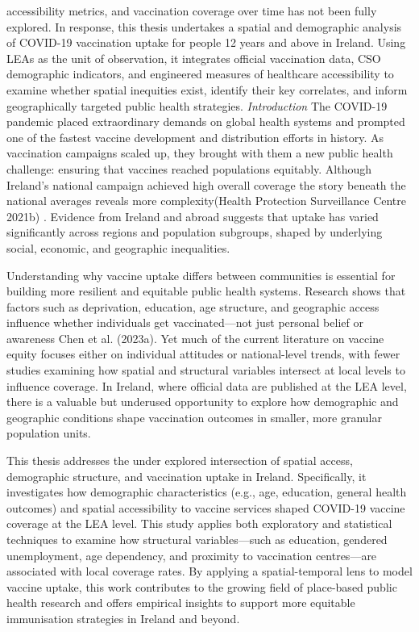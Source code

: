 \documentclass{article}
\begin{document}
accessibility metrics, and vaccination coverage over time has not been
fully explored. In response, this thesis undertakes a spatial and
demographic analysis of COVID-19 vaccination uptake for people 12 years
and above in Ireland. Using LEAs as the unit of observation, it
integrates official vaccination data, CSO demographic indicators, and
engineered measures of healthcare accessibility to examine whether
spatial inequities exist, identify their key correlates, and inform
geographically targeted public health strategies. \emph{Introduction}
The COVID-19 pandemic placed extraordinary demands on global health
systems and prompted one of the fastest vaccine development and
distribution efforts in history. As vaccination campaigns scaled up,
they brought with them a new public health challenge: ensuring that
vaccines reached populations equitably. Although Ireland's national
campaign achieved high overall coverage the story beneath the national
averages reveals more complexity(Health Protection Surveillance Centre
2021b) . Evidence from Ireland and abroad suggests that uptake has
varied significantly across regions and population subgroups, shaped by
underlying social, economic, and geographic inequalities.

Understanding why vaccine uptake differs between communities is
essential for building more resilient and equitable public health
systems. Research shows that factors such as deprivation, education, age
structure, and geographic access influence whether individuals get
vaccinated---not just personal belief or awareness Chen et al. (2023a).
Yet much of the current literature on vaccine equity focuses either on
individual attitudes or national-level trends, with fewer studies
examining how spatial and structural variables intersect at local levels
to influence coverage. In Ireland, where official data are published at
the LEA level, there is a valuable but underused opportunity to explore
how demographic and geographic conditions shape vaccination outcomes in
smaller, more granular population units.

This thesis addresses the under explored intersection of spatial access,
demographic structure, and vaccination uptake in Ireland. Specifically,
it investigates how demographic characteristics (e.g., age, education,
general health outcomes) and spatial accessibility to vaccine services
shaped COVID-19 vaccine coverage at the LEA level. This study applies
both exploratory and statistical techniques to examine how structural
variables---such as education, gendered unemployment, age dependency,
and proximity to vaccination centres---are associated with local
coverage rates. By applying a spatial-temporal lens to model vaccine
uptake, this work contributes to the growing field of place-based public
health research and offers empirical insights to support more equitable
immunisation strategies in Ireland and beyond.
\end{document}

